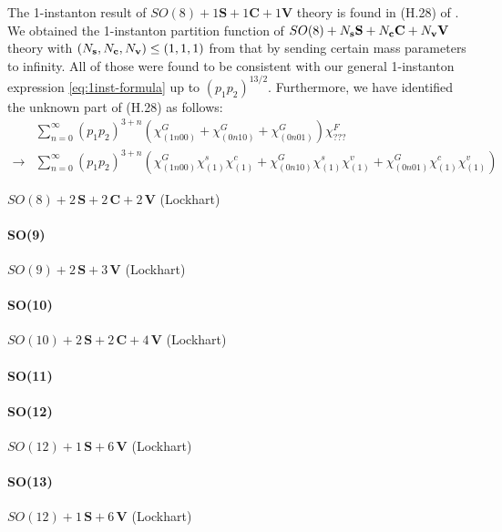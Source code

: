 \documentclass[letterpaper, 11pt]{article}
\newcommand{\nn}{\nonumber}
\begin{document}
{The 1-instanton result of $SO(8) + 1\mathbf{S} + 1\mathbf{C} + 1\mathbf{V}$ theory is found in (H.28) of \cite{DelZotto:2018tcj}.
We obtained the 1-instanton partition function of $SO(8) + N_{\bf s}\mathbf{S} + N_{\bf c}\mathbf{C} + N_{\bf v}\mathbf{V}$ theory with  $( N_{\bf s},  N_{\bf c}, N_{\bf v}) \leq ( 1,1,1)$ from that by sending certain mass parameters to infinity.
All of those were found to be consistent with our general 1-instanton expression \eqref{eq:1inst-formula} up to $(p_1p_2)^{13/2}$. 
Furthermore, we have identified the unknown part of (H.28) as follows:
\begin{align}
  &\sum_{n=0}^\infty (p
  _1p_2)^{3+n} \left(\chi^G_{(1n00)}+\chi^G_{(0n10)}+\chi^G_{(0n01)}\right)\chi^F_{???} \nn \\\longrightarrow&
  \sum_{n=0}^\infty (p_1p_2)^{3+n} \left(\chi^G_{(1n00)}\chi^s_{(1)}\chi^c_{(1)}+\chi^G_{(0n10)}\chi^s_{(1)}\chi^v_{(1)}+\chi^G_{(0n01)}\chi^c_{(1)}\chi^v_{(1)}\right)
\end{align}


$SO(8) + 2\,\mathbf{S} + 2\,\mathbf{C} + 2\,\mathbf{V}$ (Lockhart)


\paragraph{SO(9)}

$SO(9) + 2\,\mathbf{S} + 3\,\mathbf{V}$ (Lockhart)


\paragraph{SO(10)}

$SO(10) + 2\,\mathbf{S} + 2\,\mathbf{C} + 4\,\mathbf{V}$ (Lockhart)


\paragraph{SO(11)}


\paragraph{SO(12)}

$SO(12) + 1\,\mathbf{S} + 6\,\mathbf{V}$ (Lockhart) 

\paragraph{SO(13)}

$SO(12) + 1\,\mathbf{S} + 6\,\mathbf{V}$ (Lockhart) 


}
\end{document}
